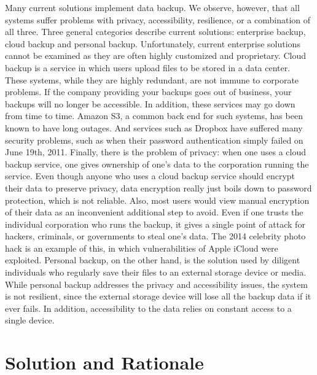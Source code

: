 Many current solutions implement data backup. We observe, however, that all systems suffer problems with privacy, accessibility, resilience, or a combination of all three. Three general categories describe current solutions: enterprise backup, cloud backup and personal backup. Unfortunately, current enterprise solutions cannot be examined as they are often highly customized and proprietary. Cloud backup is a service in which users upload files to be stored in a data center. These systems, while they are highly redundant, are not immune to corporate problems. If the company providing your backups goes out of business, your backups will no longer be accessible. In addition, these services may go down from time to time. Amazon S3, a common back end for such systems, has been known to have long outages. \cite{gigaom} \cite{rightscale}  And services such as Dropbox have suffered many security problems, such as when their password authentication simply failed on June 19th, 2011. \cite{dropbox_fail} Finally, there is the problem of privacy: when one uses a cloud backup service, one gives ownership of one's data to the corporation running the service.  Even though anyone who uses a cloud backup service should encrypt their data to preserve privacy, data encryption really just boils down to password protection, which is not reliable. \cite{password}  Also, most users would view manual encryption of their data as an inconvenient additional step to avoid.  Even if one trusts the individual corporation who runs the backup, it gives a single point of attack for hackers, criminals, or governments to steal one's data.  The 2014 celebrity photo hack is an example of this, in which vulnerabilities of Apple iCloud were exploited. \cite{theguardian}  Personal backup, on the other hand, is the solution used by diligent individuals who regularly save their files to an external storage device or media. While personal backup addresses the privacy and accessibility issues, the system is not resilient, since the external storage device will lose all the backup data if it ever fails. \cite{backblaze} In addition, accessibility to the data relies on constant access to a single device.


\section{Solution and Rationale}

